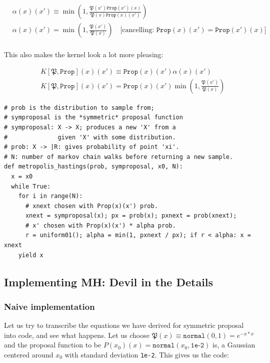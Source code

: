 \documentclass[titlepage]{article}
\renewcommand{\P}{\mathfrak{P}}
\newcommand{\Prop}{\texttt{Prop}}
\begin{document}
\begin{align*}
&\alpha(x)(x') \equiv   \min\left(1, \frac{\P(x')\Prop(x')(x)}{\P(x)\Prop(x)(x')} \right) \\
&\alpha(x)(x') = \min\left(1, \frac{\P(x')}{\P(x)} \right) \quad \text{[cancelling: $\Prop(x)(x') = \Prop(x')(x)$]}\\ 
\end{align*}

This also makes the kernel look a lot more pleasing:

\begin{align*}
&K[\P, \Prop](x)(x') \equiv \Prop(x)(x') \alpha(x)(x') \\
&K[\P, \Prop](x)(x') = \Prop(x)(x') \min\left(1, \frac{\P(x')}{\P(x)} \right) 
\end{align*}

\newpage

{\footnotesize
\begin{verbatim}
# prob is the distribution to sample from;
# symproposal is the *symmetric* proposal function
# symproposal: X -> X; produces a new 'X' from a 
#              given 'X' with some distribution.
# prob: X -> |R: gives probability of point 'xi'.
# N: number of markov chain walks before returning a new sample.
def metropolis_hastings(prob, symproposal, x0, N):
  x = x0
  while True:
    for i in range(N):
      # xnext chosen with Prop(x)(x') prob.
      xnext = symproposal(x); px = prob(x); pxnext = prob(xnext);
      # x' chosen with Prop(x)(x') * alpha prob.
      r = uniform01(); alpha = min(1, pxnext / px); if r < alpha: x = xnext
    yield x
\end{verbatim}
}

\subsection{Implementing MH: Devil in the Details}

\subsubsection{Naive implementation}

Let us try to transcribe the equations we have derived for symmetric proposal
into code, and see what happens. Let us choose $\P(x) \equiv \texttt{normal}(0, 1) = e^{-x*x}$
and the proposal function to be $P(x_0)(x) = \texttt{normal}(x_0, \texttt{1e-2})$
is, a Gaussian centered around $x_0$ with standard deviation \texttt{1e-2}.
This gives us the code:
\end{document}
